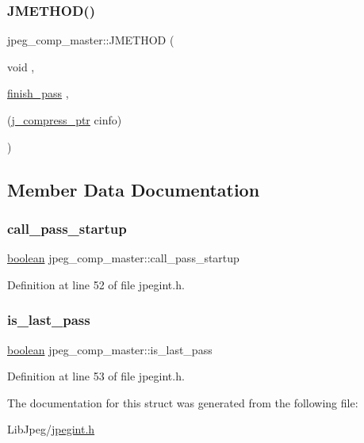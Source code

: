 \mbox{\label{structjpeg__comp__master_a81648a22581acb403aa707a5e56bf993}} 
\subsubsection{\texorpdfstring{JMETHOD()}{JMETHOD()}\hspace{0.1cm}{\footnotesize\ttfamily [3/3]}}
{\footnotesize\ttfamily jpeg\+\_\+comp\+\_\+master\+::\+J\+M\+E\+T\+H\+OD (\begin{DoxyParamCaption}\item[{void}]{,  }\item[{\mbox{\hyperlink{jcarith_8c_a3098c13232c4cb8675f1f35a80aa5944}{finish\+\_\+pass}}}]{,  }\item[{(\mbox{\hyperlink{jpeglib_8h_add2a072c54e3a51550f4975f7ddb91e7}{j\+\_\+compress\+\_\+ptr}} cinfo)}]{ }\end{DoxyParamCaption})}



\subsection{Member Data Documentation}
\mbox{\label{structjpeg__comp__master_a72c70556604030b6b10d798f6c193e6f}} 
\subsubsection{\texorpdfstring{call\_pass\_startup}{call\_pass\_startup}}
{\footnotesize\ttfamily \mbox{\hyperlink{jmorecfg_8h_a7c6368b321bd9acd0149b030bb8275ed}{boolean}} jpeg\+\_\+comp\+\_\+master\+::call\+\_\+pass\+\_\+startup}



Definition at line 52 of file jpegint.\+h.

\mbox{\label{structjpeg__comp__master_aac35b3d9e718376d1aacdde9df32e75d}} 
\subsubsection{\texorpdfstring{is\_last\_pass}{is\_last\_pass}}
{\footnotesize\ttfamily \mbox{\hyperlink{jmorecfg_8h_a7c6368b321bd9acd0149b030bb8275ed}{boolean}} jpeg\+\_\+comp\+\_\+master\+::is\+\_\+last\+\_\+pass}



Definition at line 53 of file jpegint.\+h.



The documentation for this struct was generated from the following file\+:\begin{DoxyCompactItemize}
\item 
Lib\+Jpeg/\mbox{\hyperlink{jpegint_8h}{jpegint.\+h}}\end{DoxyCompactItemize}
